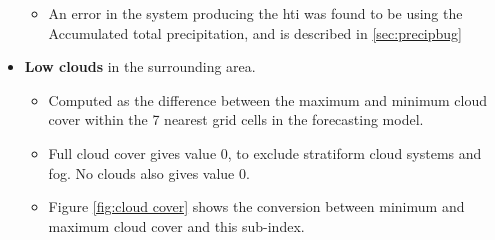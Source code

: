 \begin{itemize}
\begin{itemize}
        \item An error in the system producing the \acrshort{hti} was found to be using the Accumulated total precipitation, and is described in \ref{sec:precipbug}
    \end{itemize}
    \item \textbf{Low clouds} in the surrounding area.
    \begin{itemize}
        \item Computed as the difference between the maximum and minimum cloud cover within the 7 nearest grid cells in the forecasting model. 
        \item Full cloud cover gives value 0, to exclude stratiform cloud systems and fog. No clouds also gives value 0. 
        \item Figure \ref{fig:cloud cover} shows the conversion between minimum and maximum cloud cover and this sub-index.
    \end{itemize} 
\end{itemize}

